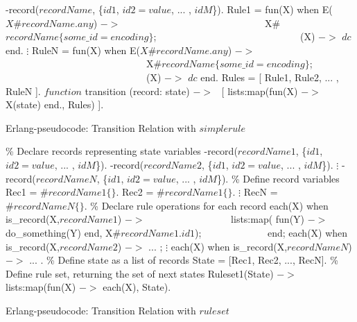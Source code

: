 \begin{algorithm}
\begin{algorithmic}
\STATE -record($recordName$, \{$id1$, $id2 = value$, $...$ , $idM$\}).
\newline
\STATE Rule1 =  fun(X) when E(\(X\#recordName.any\)) $->$ 
\STATE \ \ \ \ \ \ \ \ \ \ \ \ \ \ \ \ \ \ \ \ \ \ \ \ \ \ \ \ \ 
X\#\(recordName\{some\_id = encoding\}\); 
\STATE \ \ \ \ \ \ \ \ \ \ \ \ \ \ \ \ \ \ \ \ \ \ \ \ \ \ \ \ \
(X) $->$ $dc$ end.
\STATE $\vdots$
\STATE RuleN =  fun(X) when E(\(X\#recordName.any\))  $->$ 
\STATE \ \ \ \ \ \ \ \ \ \ \ \ \ \ \ \ \ \ \ \ \ \ \ \ \ \ \ \ \ 
X\#\(recordName\{some\_id = encoding\}\); 
\STATE \ \ \ \ \ \ \ \ \ \ \ \ \ \ \ \ \ \ \ \ \ \ \ \ \ \ \ \ \
(X) $->$ $dc$ end.
\newline
\STATE Rules = [ Rule1, Rule2, ... , RuleN ].
\newline
\STATE $function$ transition (record: state) $->$ 
\STATE \ [ lists:map(fun(X) $->$ X(state) end., Rules) ].
\caption{Erlang-pseudocode: Transition Relation with $simplerule$}
\label{TRsimplerule}
\end{algorithmic}
\end{algorithm}


\begin{algorithm}
\begin{algorithmic}
\STATE \% Declare records representing state variables
\STATE -record($recordName1$, \{$id1$, $id2 = value$, $...$ , $idM$\}).
\STATE -record($recordName2$, \{$id1$, $id2 = value$, $...$ , $idM$\}).
\STATE $\vdots$
\STATE -record($recordNameN$, \{$id1$, $id2 = value$, $...$ , $idM$\}).
\newline
\STATE \% Define record variables
\STATE Rec1  =  $\#recordName1\{\}.$ 
\STATE Rec2  =  $\#recordName1\{\}.$ 
\STATE $\vdots$
\STATE RecN  =  $\#recordNameN\{\}.$ 
\newline
\STATE \% Declare rule operations for each record 
\STATE each(X) when is\_record(X,$recordName1$) $->$
\STATE \ \ \ \ \ \ \ \ \ \ \ \ \ \ \ \ \ lists:map( fun(Y) $->$ 
                           do\_something(Y) end, X\#$recordName1.id1$);          
\STATE \ \ \ \ \ \ \ \ \ \ \ \ \ end;
\STATE each(X) when is\_record(X,$recordName2$) $->$ ... ;
\STATE $\vdots$
\STATE each(X) when is\_record(X,$recordNameN$) $->$ ... .
\newline
\STATE \% Define state as a list of records
\STATE State =  [Rec1, Rec2, ..., RecN].
\newline
\STATE \% Define rule set, returning the set of next states
\STATE Ruleset1(State) $->$ lists:map(fun(X) $->$ each(X), State).
\caption{Erlang-pseudocode: Transition Relation with $ruleset$}
\label{TRrulseset}
\end{algorithmic}
\end{algorithm}




